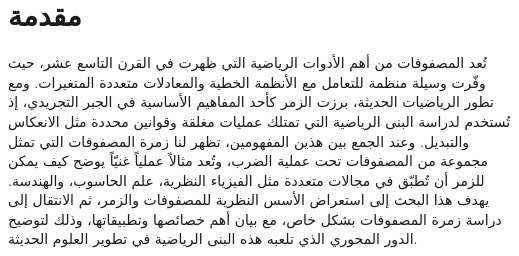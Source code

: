 \chapter*{مقدمة}
تُعد المصفوفات من أهم الأدوات الرياضية التي ظهرت في القرن التاسع عشر، حيث وفّرت وسيلة منظمة للتعامل مع الأنظمة الخطية والمعادلات متعددة المتغيرات. ومع تطور الرياضيات الحديثة، برزت الزمر كأحد المفاهيم الأساسية في الجبر التجريدي، إذ تُستخدم لدراسة البنى الرياضية التي تمتلك عمليات مغلقة وقوانين محددة مثل الانعكاس والتبديل. وعند الجمع بين هذين المفهومين، تظهر لنا زمرة المصفوفات التي تمثل مجموعة من المصفوفات تحت عملية الضرب، وتُعد مثالاً عملياً غنيّاً يوضح كيف يمكن للزمر أن تُطبّق في مجالات متعددة مثل الفيزياء النظرية، علم الحاسوب، والهندسة.  
يهدف هذا البحث إلى استعراض الأسس النظرية للمصفوفات والزمر، ثم الانتقال إلى دراسة زمرة المصفوفات بشكل خاص، مع بيان أهم خصائصها وتطبيقاتها، وذلك لتوضيح الدور المحوري الذي تلعبه هذه البنى الرياضية في تطوير العلوم الحديثة.